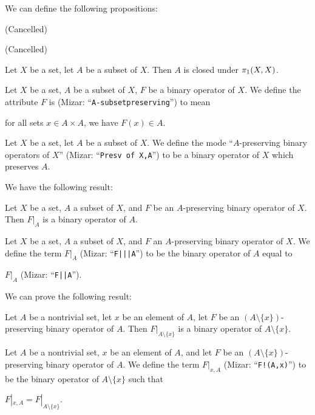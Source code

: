 \documentclass{article}
\begin{document}
We can define the following propositions:
\begin{thm}
\item\label{realset1:3} (Cancelled)
\item\label{realset1:4} (Cancelled)
\item\label{realset1:5} Let $X$ be a set, let $A$ be a subset of $X$.
  Then $A$ is closed under $\pi_{1}(X, X)$.
\end{thm}

\skipdefn

\begin{definition}
Let $X$ be a set, $A$ be a subset of $X$, $F$ be a binary operator of $X$.
We define the attribute $F$ is 
(Mizar: ``\verb#A-subsetpreserving#'')
to mean
\begin{defn}[start=4]
\item for all sets $x\in A\times A$, we have $F(x)\in A$.
\end{defn}
\end{definition}

\begin{definition}
Let $X$ be a set, let $A$ be a subset of $X$.
We define the mode ``$A$-preserving binary operators of $X$''
(Mizar: ``\verb#Presv of X,A#'') to be a binary operator of $X$ which
preserves $A$.
\end{definition}

We have the following result:
\begin{thm}
\item\label{realset1:6} Let $X$ be a set, $A$ a subset of $X$, and $F$
  be an $A$-preserving binary operator of $X$.
  Then $F|_{A}$ is a binary operator of $A$.
\end{thm}

\begin{definition}
Let $X$ be a set, $A$ a subset of $X$, and $F$ an $A$-preserving binary
operator of $X$. We define the term $F|_{A}$ (Mizar: ``\verb#F|||A#'')
to be the binary operator of $A$ equal to
\begin{defn}
\item $F|_{A}$ (Mizar: ``\verb#F||A#'').
\end{defn}
\end{definition}

We can prove the following result:
\begin{thm}
\item\label{realset1:7} Let $A$ be a nontrivial set, let $x$ be an
  element of $A$, let $F$ be an $(A\setminus\{x\})$-preserving binary
  operator of $A$.
  Then $F|_{A\setminus\{x\}}$ is a binary operator of $A\setminus\{x\}$.
\end{thm}

\skipdefn

\begin{definition}
Let $A$ be a nontrivial set, $x$ be an element of $A$, and let $F$ be an
$(A\setminus\{x\})$-preserving binary operator of $A$.
We define the term $F|_{x,A}$ (Mizar: ``\verb#F!(A,x)#'') to be the
binary operator of $A\setminus\{x\}$ such that
\begin{defn}[start=7]
\item $F|_{x,A}=F|_{A\setminus\{x\}}$.
\end{defn}
\end{definition}
\end{document}
